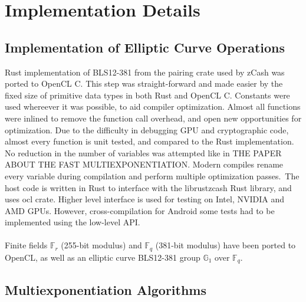\chapter{Implementation Details} %

\label{Chapter5} %


\section{Implementation of Elliptic Curve Operations}


Rust implementation of BLS12-381 from the pairing crate used by zCash was ported to OpenCL C. This step was straight-forward and made easier by the fixed size of primitive data types in both Rust and OpenCL C. Constants were used whereever it was possible, to aid compiler optimization. Almost all functions were inlined to remove the function call overhead, and open new opportunities for optimization. Due to the difficulty in debugging GPU and cryptographic code, almost every function is unit tested, and compared to the Rust implementation. No reduction in the number of variables was attempted like in THE PAPER ABOUT THE FAST MULTIEXPONENTIATION. Modern compiles rename every variable during compilation and perform multiple optimization passes.\
The host code is written in Rust to interface with the librustzcash Rust library, and uses ocl crate. Higher level interface is used for testing on Intel, NVIDIA and AMD GPUs. However, cross-compilation for Android some tests had to be implemented using the low-level API.\\
\\
Finite fields $\mathbb{F}_r$ (255-bit modulus) and $\mathbb{F}_q$ (381-bit modulus) have been ported to OpenCL, as well as an elliptic curve BLS12-381 group $\mathbb{G}_1$ over $\mathbb{F}_q$.

\section{Multiexponentiation Algorithms}

